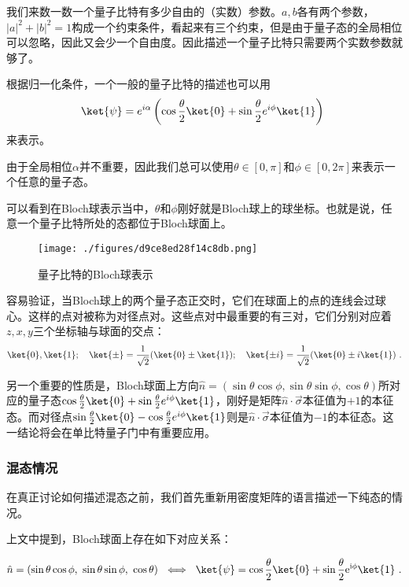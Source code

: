 我们来数一数一个量子比特有多少自由的（实数）参数。$a,b$各有两个参数，$|a|^2+|b|^2=1$构成一个约束条件，看起来有三个约束，但是由于量子态的全局相位可以忽略，因此又会少一个自由度。因此描述一个量子比特只需要两个实数参数就够了。

根据归一化条件，一个一般的量子比特的描述也可以用
\begin{equation}
\ket{\psi}=e^{i\alpha}\left(\cos\frac{\theta}{2}\ket{0}+\sin\frac{\theta}{2}e^{i\phi}\ket{1}\right)~
\end{equation}
来表示。

由于全局相位$\alpha$并不重要，因此我们总可以使用$\theta\in[0,\pi]$和$\phi\in[0,2\pi]$来表示一个任意的量子态。

可以看到在Bloch球表示当中，$\theta$和$\phi$刚好就是Bloch球上的球坐标。也就是说，任意一个量子比特所处的态都位于Bloch球面上。

\begin{figure}[ht]
\centering
\texttt{[image: ./figures/d9ce8ed28f14c8db.png]}
\caption{量子比特的Bloch球表示} \label{fig_Qubit}
\end{figure}

容易验证，当Bloch球上的两个量子态正交时，它们在球面上的点的连线会过球心。这样的点对被称为对径点对。这些点对中最重要的有三对，它们分别对应着$z,x,y$三个坐标轴与球面的交点：
\begin{equation}
\ket{0},\ket{1};\quad \ket{\pm}=\frac{1}{\sqrt{2}}(\ket{0}\pm\ket{1});\quad \ket{\pm i}=\frac{1}{\sqrt{2}}(\ket{0}\pm i\ket{1})~.
\end{equation}

另一个重要的性质是，Bloch球面上方向$\hat{n}=(\sin\theta\cos\phi,\sin\theta\sin\phi,\cos\theta)$所对应的量子态$\cos\frac{\theta}{2}\ket{0}+\sin\frac{\theta}{2}e^{i\phi}\ket{1}$，刚好是矩阵$\hat{n}\cdot\vec{\sigma}$本征值为$+1$的本征态。而对径点$\sin\frac{\theta}{2}\ket{0}-\cos\frac{\theta}{2}e^{i\phi}\ket{1}$则是$\hat{n}\cdot\vec{\sigma}$本征值为$-1$的本征态。这一结论将会在单比特量子门中有重要应用。

\subsubsection{混态情况}


在真正讨论如何描述混态之前，我们首先重新用密度矩阵的语言描述一下纯态的情况。

上文中提到，Bloch球面上存在如下对应关系：

\begin{equation}
\hat{n} = \left(  \sin \theta \cos \phi ,~ \sin\theta \sin\phi ,~ \cos\theta  \right) ~\iff~\ket{\psi} = \cos\frac{\theta}{2}\ket{0} + \sin\frac{\theta}{2}\mathrm{e}^{\mathrm{i}\phi}\ket{1}~.
\end{equation}

